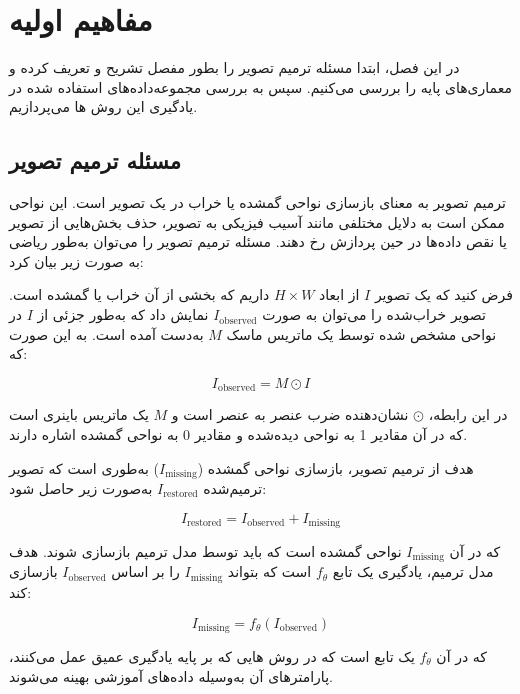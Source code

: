 
\chapter{مفاهیم اولیه}

در این فصل،‌ ابتدا مسئله ترمیم تصویر را بطور مفصل تشریح و تعریف کرده و معماری‌های پایه را بررسی می‌کنیم. سپس به بررسی مجموعه‌داده‌های استفاده شده در یادگیری این روش ها می‌پردازیم.

\section{مسئله ترمیم تصویر}


ترمیم تصویر به معنای بازسازی نواحی گمشده یا خراب در یک تصویر است. این نواحی ممکن است به دلایل مختلفی مانند آسیب فیزیکی به تصویر، حذف بخش‌هایی از تصویر یا نقص داده‌ها در حین پردازش رخ دهند. مسئله ترمیم تصویر را می‌توان به‌طور ریاضی به صورت زیر بیان کرد:

فرض کنید که یک تصویر $I$ از ابعاد $H \times W$ داریم که بخشی از آن خراب یا گمشده است. تصویر خراب‌شده را می‌توان به صورت $I_{\text{observed}}$ نمایش داد که به‌طور جزئی از $I$ در نواحی مشخص شده توسط یک ماتریس ماسک $M$ به‌دست آمده است. به این صورت که:

$$
I_{\text{observed}} = M \odot I
$$

در این رابطه، $\odot$ نشان‌دهنده ضرب عنصر به عنصر است و $M$ یک ماتریس باینری است که در آن مقادیر 1 به نواحی دیده‌شده و مقادیر 0 به نواحی گمشده اشاره دارند.

هدف از ترمیم تصویر، بازسازی نواحی گمشده ($I_{\text{missing}}$) به‌طوری است که تصویر ترمیم‌شده $I_{\text{restored}}$ به‌صورت زیر حاصل شود:

$$
I_{\text{restored}} = I_{\text{observed}} + I_{\text{missing}}
$$

که در آن $I_{\text{missing}}$ نواحی گمشده است که باید توسط مدل ترمیم بازسازی شوند. هدف مدل ترمیم، یادگیری یک تابع $f_{\theta}$ است که بتواند $I_{\text{missing}}$ را بر اساس $I_{\text{observed}}$ بازسازی کند:

$$
I_{\text{missing}} = f_{\theta}(I_{\text{observed}})
$$

که در آن $f_{\theta}$ یک تابع است که در روش هایی که بر پایه یادگیری عمیق عمل می‌کنند، پارامترهای آن به‌وسیله داده‌های آموزشی بهینه می‌شوند.

